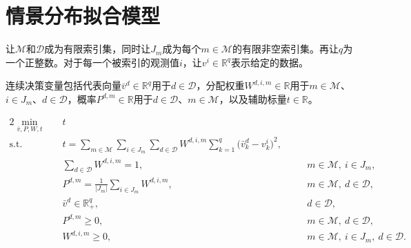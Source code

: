 \documentclass{article}
\begin{document}
\section*{情景分布拟合模型}

让$\mathcal M$和$\mathcal D$成为有限索引集，同时让$J_m$成为每个$m\in\mathcal M$的有限非空索引集。再让$q$为一个正整数。对于每一个被索引的观测值$i$，让$v^i\in\mathbb R^q$表示给定的数据。

连续决策变量包括代表向量$\bar v^d\in\mathbb R^q$用于$d\in\mathcal D$，分配权重$W^{d,i,m}\in\mathbb R$用于$m\in\mathcal M$、$i\in J_m$、$d\in\mathcal D$，概率$P^{d,m}\in\mathbb R$用于$d\in\mathcal D$、$m\in\mathcal M$，以及辅助标量$t\in\mathbb R$。

\begin{alignat}{2}
\min_{\bar v,P,W,t}\quad & t \\
\text{s.t.}\quad
&t=\sum_{m\in\mathcal M}\sum_{i\in J_m}\sum_{d\in\mathcal D}W^{d,i,m}\sum_{k=1}^{q}\bigl(\bar v_k^d-v_k^i\bigr)^2, & &\\
&\sum_{d\in\mathcal D}W^{d,i,m}=1, & &\quad m\in\mathcal M,\ i\in J_m,\\
&P^{d,m}=\frac{1}{|J_m|}\sum_{i\in J_m}W^{d,i,m}, & &\quad m\in\mathcal M,\ d\in\mathcal D,\\
&\bar v^d\in\mathbb R_+^q, & &\quad d\in\mathcal D,\\
&P^{d,m}\ge 0, & &\quad m\in\mathcal M,\ d\in\mathcal D,\\
&W^{d,i,m}\ge 0, & &\quad m\in\mathcal M,\ i\in J_m,\ d\in\mathcal D.
\end{alignat}
\end{document}

